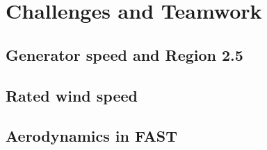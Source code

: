 \chapter{Challenges and Teamwork}

\section{Generator speed and Region 2.5}

\section{Rated wind speed}

\section{Aerodynamics in FAST}